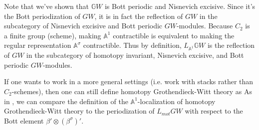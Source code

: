 \documentclass[draftthesis,tocnosub,noragright,centerchapter,10pt]{uiucthesis2009}
\newcommand{\mbb}{\mathbb}
\DeclareMathOperator{\iHom}{\mathbf{Hom}}
\theoremstyle{plain}
\newtheorem{lemma}{Lemma}
\theoremstyle{definition}
\begin{document}
Note that we've shown that $\mbb GW$ is Bott periodic and
Nisnevich excisive. Since it's the Bott periodization of $GW$, it is
in fact the reflection of $GW$
in the subcategory of Nisnevich excisive and Bott periodic
$GW$-modules. Because $C_2$ is a finite group (scheme), making $\mbb
A^1$ contractible is equivalent to making the regular representation
$\mbb A^\sigma$ contractible. Thus by definition, $L_{\mbb A^1}\mbb
GW$ is the reflection of $GW$ in the subcategory of homotopy
invariant, Nisnevich excisive, and Bott periodic $GW$-modules. 



If one wants to work in a more general settings (i.e. work with stacks
rather than $C_2$-schemes), then one can still define homotopy
Grothendieck-Witt theory as 
As in \cite{cdhdesc}, we can compare the definition of the $\mbb
A^1$-localization of homotopy
Grothendieck-Witt theory to the periodization of $L_{mot} GW$ with
respect to the Bott element $\beta' \otimes (\beta^\sigma)'$.



\end{document}
